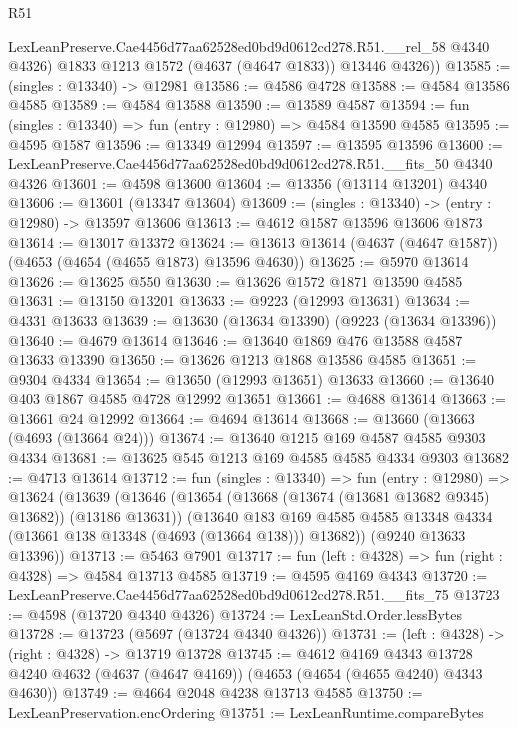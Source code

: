\begin{lexlean}{R51}
\begin{coremodule}
        LexLeanPreserve.Cae4456d77aa62528ed0bd9d0612cd278.R51.__rel_58 @4340 @4326)
        @1833
        @1213
        @1572
        (@4637 (@4647 @1833))
        @13446
        @4326))
@13585 := (singles : @13340) -> @12981
@13586 := @4586 @4728
@13588 := @4584 @13586 @4585
@13589 := @4584 @13588
@13590 := @13589 @4587
@13594 := fun (singles : @13340) => fun (entry : @12980) => @4584 @13590 @4585
@13595 := @4595 @1587
@13596 := @13349 @12994
@13597 := @13595 @13596
@13600 := LexLeanPreserve.Cae4456d77aa62528ed0bd9d0612cd278.R51.__fits_50 @4340 @4326
@13601 := @4598 @13600
@13604 := @13356 (@13114 @13201) @4340
@13606 := @13601 (@13347 @13604)
@13609 := (singles : @13340) -> (entry : @12980) -> @13597 @13606
@13613 := @4612 @1587 @13596 @13606 @1873
@13614 := @13017 @13372
@13624 := @13613 @13614 (@4637 (@4647 @1587)) (@4653 (@4654 (@4655 @1873) @13596 @4630))
@13625 := @5970 @13614
@13626 := @13625 @550
@13630 := @13626 @1572 @1871 @13590 @4585
@13631 := @13150 @13201
@13633 := @9223 (@12993 @13631)
@13634 := @4331 @13633
@13639 := @13630 (@13634 @13390) (@9223 (@13634 @13396))
@13640 := @4679 @13614
@13646 := @13640 @1869 @476 @13588 @4587 @13633 @13390
@13650 := @13626 @1213 @1868 @13586 @4585
@13651 := @9304 @4334
@13654 := @13650 (@12993 @13651) @13633
@13660 := @13640 @403 @1867 @4585 @4728 @12992 @13651
@13661 := @4688 @13614
@13663 := @13661 @24 @12992
@13664 := @4694 @13614
@13668 := @13660 (@13663 (@4693 (@13664 @24)))
@13674 := @13640 @1215 @169 @4587 @4585 @9303 @4334
@13681 := @13625 @545 @1213 @169 @4585 @4585 @4334 @9303
@13682 := @4713 @13614
@13712 := fun (singles : @13340) =>
  fun (entry : @12980) =>
  @13624
    (@13639
      (@13646
        (@13654 (@13668 (@13674 (@13681 @13682 @9345) @13682)) (@13186 @13631))
        (@13640
          @183
          @169
          @4585
          @4585
          @13348
          @4334
          (@13661 @138 @13348 (@4693 (@13664 @138)))
          @13682))
      (@9240 @13633 @13396))
@13713 := @5463 @7901
@13717 := fun (left : @4328) => fun (right : @4328) => @4584 @13713 @4585
@13719 := @4595 @4169 @4343
@13720 := LexLeanPreserve.Cae4456d77aa62528ed0bd9d0612cd278.R51.__fits_75
@13723 := @4598 (@13720 @4340 @4326)
@13724 := LexLeanStd.Order.lessBytes
@13728 := @13723 (@5697 (@13724 @4340 @4326))
@13731 := (left : @4328) -> (right : @4328) -> @13719 @13728
@13745 := @4612
    @4169
    @4343
    @13728
    @4240
    @4632
    (@4637 (@4647 @4169))
    (@4653 (@4654 (@4655 @4240) @4343 @4630))
@13749 := @4664 @2048 @4238 @13713 @4585
@13750 := LexLeanPreservation.encOrdering
@13751 := LexLeanRuntime.compareBytes

\end{coremodule}
\end{lexlean}
